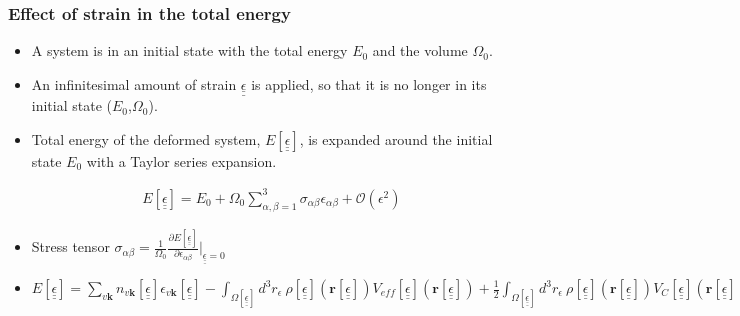\documentclass[10pt, handout]{beamer}
\newcommand{\br}{\bm{r}}
\newcommand{\sig}{\sigma}
\newcommand{\al}{\alpha}
\newcommand{\eps}{\epsilon}
\newcommand{\teps}{\underline{\underline{\epsilon}}}
\newcommand{\nologo}{\setbeamertemplate{logo}{}}  %
\begin{document}
{\nologo
	\begin{frame}
		\frametitle{Effect of strain in the total energy}
		{\small	
			\begin{itemize}
				\item A system is in an initial state with the total energy $E_0$ and the volume $\Omega_{0}$.
				\item An infinitesimal amount of strain $\teps$ is applied, so that it is no longer in its initial state ($E_0$,$\Omega_{0}$).
				\item Total energy of the deformed system, $E[\teps]$, is expanded around the initial state $E_0$ with a Taylor series expansion.
				
				\begin{eqnarray}\nonumber
                	E[\teps] = E_0 + \Omega_{0} \sum_{\al,\beta=1}^3 \sig_{\al \beta} \eps_{\al \beta} + \mathcal{O}(\eps^2) 
                \end{eqnarray}			
			
			
				\item Stress tensor $\sigma_{\al \beta} = \frac{1}{\Omega_0} \frac{\partial E[\teps]}{\partial \eps_{\al \beta}}\Big|_{\teps=0}$
				
				\item $ E[\teps] = \sum_{v\textbf{k}}n_{v\textbf{k}}[\teps]\epsilon_{v\textbf{k}}[\teps]-\int_{\Omega[\teps]}d^3r_\epsilon~\rho[\teps](\br[\teps])V_{eff}[\teps](\br[\teps]) +
				\frac{1}{2}\int_{\Omega[\teps]}d^3r_\epsilon~\rho[\teps](\br[\teps])V_{C}[\teps](\br[\teps])-\frac{1}{2}\sum_{a\in\Omega}Z_aV_M^a[\teps](\tau_a[\teps]) +
				\int_{\Omega[\teps]}d^3r_\epsilon\rho[\teps](\br[\teps])\epsilon_{xc}[\teps](\br[\teps]) $              
			\end{itemize}
		}   	
	\end{frame}
}
\end{document}
